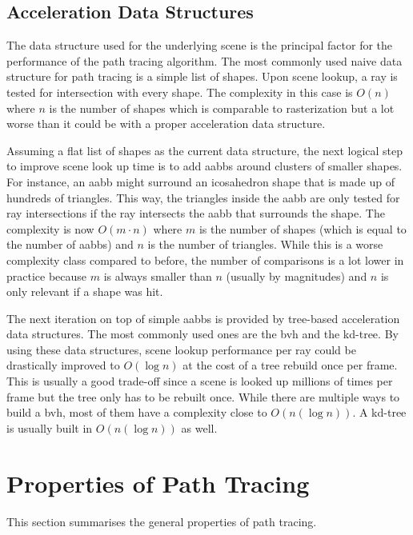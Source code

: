 \documentclass[
  twoside,
  11pt, a4paper,
  footinclude=true,
  headinclude=true,
  cleardoublepage=empty
]{scrreprt}
\begin{document}
\subsection{Acceleration Data Structures}
The data structure used for the underlying scene is the principal factor for the performance of the
path tracing algorithm. The most commonly used naive data structure for path tracing is a simple
list of shapes. Upon scene lookup, a ray is tested for intersection with every shape. The
complexity in this case is \(O(n)\) where \(n\) is the number of shapes which is comparable to rasterization but a lot worse than it
could be with a proper acceleration data structure.

Assuming a flat list of shapes as the current data structure, the next logical step to improve
scene look up time is to add \acp{aabb} around clusters of smaller shapes. For instance, an
\ac{aabb} might surround an icosahedron shape that is made up of hundreds of triangles. This way,
the triangles inside the \ac{aabb} are only tested for ray intersections if the ray intersects the
\ac{aabb} that surrounds the shape. The complexity is now \(O(m \cdot n)\) where \(m\) is the number
of shapes (which is equal to the number of \acp{aabb}) and \(n\) is the number of triangles. While
this is a worse complexity class compared to before, the number of comparisons is a lot lower in
practice because \(m\) is always smaller than \(n\) (usually by magnitudes) and \(n\) is only
relevant if a shape was hit.

The next iteration on top of simple \acp{aabb} is provided by tree-based acceleration data
structures. The most commonly used ones are the \ac{bvh} and the kd-tree. By using these data
structures, scene lookup performance per ray could be drastically improved to \(O(\log n)\) at the
cost of a tree rebuild once per frame. This is usually a good trade-off since a scene is looked up
millions of times per frame but the tree only has to be rebuilt once. While there are multiple
ways to build a \ac{bvh}, most of them have a complexity close to \(O(n(\log n))\). A kd-tree is
usually built in \(O(n(\log n))\) as well.

\section{Properties of Path Tracing}
This section summarises the general properties of path tracing.
\end{document}
